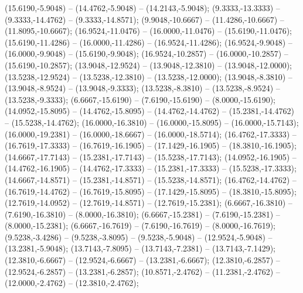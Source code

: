    (15.6190,-5.9048) -- (14.4762,-5.9048) -- (14.2143,-5.9048);
   (9.3333,-13.3333) -- (9.3333,-14.4762) -- (9.3333,-14.8571);
   (9.9048,-10.6667) -- (11.4286,-10.6667) -- (11.8095,-10.6667);
   (16.9524,-11.0476) -- (16.0000,-11.0476) -- (15.6190,-11.0476);
   (15.6190,-11.4286) -- (16.0000,-11.4286) -- (16.9524,-11.4286);
   (16.9524,-9.9048) -- (16.0000,-9.9048) -- (15.6190,-9.9048);
   (16.9524,-10.2857) -- (16.0000,-10.2857) -- (15.6190,-10.2857);
   (13.9048,-12.9524) -- (13.9048,-12.3810) -- (13.9048,-12.0000);
   (13.5238,-12.9524) -- (13.5238,-12.3810) -- (13.5238,-12.0000);
   (13.9048,-8.3810) -- (13.9048,-8.9524) -- (13.9048,-9.3333);
   (13.5238,-8.3810) -- (13.5238,-8.9524) -- (13.5238,-9.3333);
   (6.6667,-15.6190) -- (7.6190,-15.6190) -- (8.0000,-15.6190);
   (14.0952,-15.8095) -- (14.4762,-15.8095) -- (14.4762,-14.4762) -- (15.2381,-14.4762) -- (15.5238,-14.4762);
   (16.0000,-16.3810) -- (16.0000,-15.8095) -- (16.0000,-15.7143);
   (16.0000,-19.2381) -- (16.0000,-18.6667) -- (16.0000,-18.5714);
   (16.4762,-17.3333) -- (16.7619,-17.3333) -- (16.7619,-16.1905) -- (17.1429,-16.1905) -- (18.3810,-16.1905);
   (14.6667,-17.7143) -- (15.2381,-17.7143) -- (15.5238,-17.7143);
   (14.0952,-16.1905) -- (14.4762,-16.1905) -- (14.4762,-17.3333) -- (15.2381,-17.3333) -- (15.5238,-17.3333);
   (14.6667,-14.8571) -- (15.2381,-14.8571) -- (15.5238,-14.8571);
   (16.4762,-14.4762) -- (16.7619,-14.4762) -- (16.7619,-15.8095) -- (17.1429,-15.8095) -- (18.3810,-15.8095);
   (12.7619,-14.0952) -- (12.7619,-14.8571) -- (12.7619,-15.2381);
   (6.6667,-16.3810) -- (7.6190,-16.3810) -- (8.0000,-16.3810);
   (6.6667,-15.2381) -- (7.6190,-15.2381) -- (8.0000,-15.2381);
   (6.6667,-16.7619) -- (7.6190,-16.7619) -- (8.0000,-16.7619);
   (9.5238,-3.4286) -- (9.5238,-3.8095) -- (9.5238,-5.9048) -- (12.9524,-5.9048) -- (13.2381,-5.9048);
   (13.7143,-7.8095) -- (13.7143,-7.2381) -- (13.7143,-7.1429);
   (12.3810,-6.6667) -- (12.9524,-6.6667) -- (13.2381,-6.6667);
   (12.3810,-6.2857) -- (12.9524,-6.2857) -- (13.2381,-6.2857);
   (10.8571,-2.4762) -- (11.2381,-2.4762) -- (12.0000,-2.4762) -- (12.3810,-2.4762);
